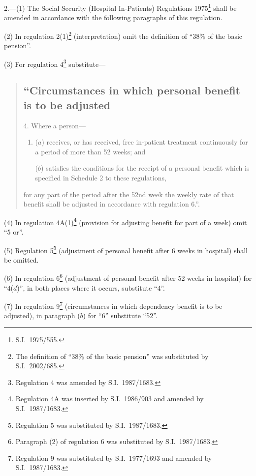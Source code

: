 \documentclass[12pt,a4paper]{article}
\begin{document}
2.---(1)  The Social Security (Hospital In-Patients) Regulations 1975\footnote{S.I.\ 1975/555.} shall be amended in accordance with the following paragraphs of this regulation.

(2) In regulation 2(1)\footnote{The definition of “38\% of the basic pension” was substituted by S.I.\ 2002/685.} (interpretation) omit the definition of “38\% of the basic pension”.

(3) For regulation 4\footnote{Regulation 4 was amended by S.I.\ 1987/1683.} substitute—
\begin{quotation}
\subsection*{“Circumstances in which personal benefit is to be adjusted}

4. Where a person—
\begin{enumerate}\item[]
($a$) receives, or has received, free in-patient treatment continuously for a period of more than 52 weeks; and

($b$) satisfies the conditions for the receipt of a personal benefit which is specified in Schedule 2 to these regulations,
\end{enumerate}
for any part of the period after the 52nd week the weekly rate of that benefit shall be adjusted in accordance with regulation 6.”.
\end{quotation}

(4) In regulation 4A(1)\footnote{Regulation 4A was inserted by S.I.\ 1986/903 and amended by S.I.\ 1987/1683.} (provision for adjusting benefit for part of a week) omit “5 or”.

(5) Regulation 5\footnote{Regulation 5 was substituted by S.I.\ 1987/1683.} (adjustment of personal benefit after 6 weeks in hospital) shall be omitted.

(6) In regulation 6\footnote{Paragraph (2) of regulation 6 was substituted by S.I.\ 1987/1683.} (adjustment of personal benefit after 52 weeks in hospital) for “4($d$)”, in both places where it occurs, substitute “4”.

(7) In regulation 9\footnote{Regulation 9 was substituted by S.I.\ 1977/1693 and amended by S.I.\ 1987/1683.} (circumstances in which dependency benefit is to be adjusted), in paragraph ($b$)  for “6” substitute “52”.
\end{document}
